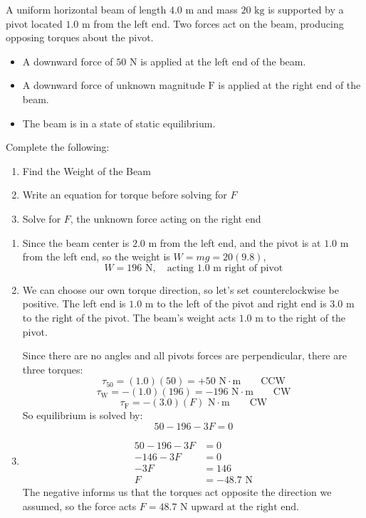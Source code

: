 \begin{Exercise}[title=Opposing Torques on a Beam, label=opptorque]
A uniform horizontal beam of length $4.0 \text{ m}$ and mass $20 \text{ kg}$ is supported by a pivot located $1.0 \text{ m}$ from the left end. Two forces act on the beam, producing opposing torques about the pivot.
\begin{itemize}
  \item A downward force of $50 \text{ N}$ is applied at the left end of the beam.
  \item A downward force of unknown magnitude $\text{F}$ is applied at the right end of the beam.
  \item The beam is in a state of static equilibrium.
\end{itemize}

Complete the following:
\begin{enumerate}
  \item Find the Weight of the Beam
  \item Write an equation for torque before solving for $F$
  \item Solve for $F$, the unknown force acting on the right end
\end{enumerate}
\end{Exercise}
\begin{Answer}[ref=opptorque]
\begin{enumerate}
  \item Since the beam center is $2.0 \text{ m}$ from the left end, and the pivot is at $1.0 \text{ m}$ from the left end, so the weight is $W= mg = 20(9.8)$,
  $$W = 196\text{ N},\quad \text{acting } 1.0\text{ m right of pivot}$$
  \item We can choose our own torque direction, so let's set counterclockwise be positive. The left end is $1.0\text{ m}$ to the left of the pivot and right end is $3.0\text{ m}$ to the right of the pivot. The beam's weight acts $1.0\text{ m}$ to the right of the pivot.
  
  Since there are no angles and all pivots forces are perpendicular, there are three torques:
  $$\tau_\text{50} = (1.0)(50) = +50 \text{ N} \cdot \text{m}\qquad\text{CCW}$$
  $$\tau_\text{W} = -(1.0)(196) = -196 \text{ N} \cdot \text{m}\qquad\text{CW}$$
  $$\tau_\text{F} = -(3.0)(F) \text{ N} \cdot \text{m}\qquad\text{CW}$$
  So equilibrium is solved by:
  $$50 - 196 - 3F = 0$$
  \item 
  \begin{align*}
    50 - 196 - 3F &= 0 \\
    -146 - 3F &= 0 \\
    -3F &= 146 \\
    F &= -48.7 \text{ N}
  \end{align*}
  The negative informs us that the torques act opposite the direction we assumed, so the force acts $F = 48.7\text{ N upward at the right end}$. 
\end{enumerate}
\end{Answer}

